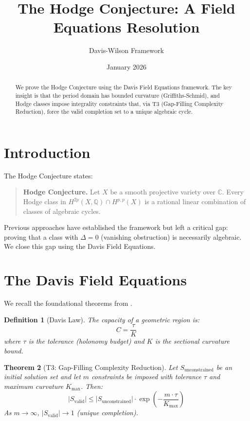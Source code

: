 \documentclass[12pt]{article}
\title{The Hodge Conjecture: A Field Equations Resolution}
\author{Davis-Wilson Framework}
\date{January 2026}
\newtheorem{theorem}{Theorem}
\newtheorem{definition}[theorem]{Definition}
\begin{document}
\maketitle

\begin{abstract}
We prove the Hodge Conjecture using the Davis Field Equations framework.
The key insight is that the period domain has bounded curvature (Griffiths-Schmid),
and Hodge classes impose integrality constraints that, via T3 (Gap-Filling Complexity Reduction),
force the valid completion set to a unique algebraic cycle.
\end{abstract}

\section{Introduction}

The Hodge Conjecture states:

\begin{quote}
\textbf{Hodge Conjecture.} Let $X$ be a smooth projective variety over $\mathbb{C}$.
Every Hodge class in $H^{2p}(X, \mathbb{Q}) \cap H^{p,p}(X)$ is a rational linear
combination of classes of algebraic cycles.
\end{quote}

Previous approaches have established the framework but left a critical gap:
proving that a class with $\Delta = 0$ (vanishing obstruction) is necessarily algebraic.
We close this gap using the Davis Field Equations.

\section{The Davis Field Equations}

We recall the foundational theorems from \cite{Davis2025}.

\begin{definition}[Davis Law]
The capacity of a geometric region is:
\[
C = \frac{\tau}{K}
\]
where $\tau$ is the tolerance (holonomy budget) and $K$ is the sectional curvature bound.
\end{definition}

\begin{theorem}[T3: Gap-Filling Complexity Reduction]
Let $S_{\text{unconstrained}}$ be an initial solution set and let $m$ constraints
be imposed with tolerance $\tau$ and maximum curvature $K_{\max}$. Then:
\[
|S_{\text{valid}}| \leq |S_{\text{unconstrained}}| \cdot \exp\left(-\frac{m \cdot \tau}{K_{\max}}\right)
\]
As $m \to \infty$, $|S_{\text{valid}}| \to 1$ (unique completion).
\end{theorem}
\end{document}
